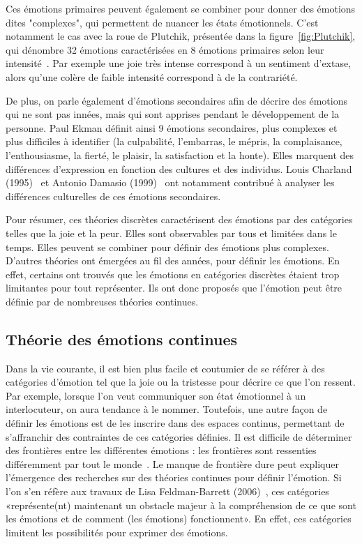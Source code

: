 

Ces émotions primaires peuvent également se combiner pour donner des émotions dites "complexes", qui permettent de nuancer les états émotionnels. C'est notamment le cas avec la roue de Plutchik, présentée dans la figure~\ref{fig:Plutchik}, qui dénombre 32 émotions caractérisées en 8 émotions primaires selon leur intensité~\cite{Plutchik1980}. Par exemple une joie très intense correspond à un sentiment d'extase, alors qu'une colère de faible intensité correspond à de la contrariété.

De plus, on parle également d'émotions secondaires afin de décrire des émotions qui ne sont pas innées, mais qui sont apprises pendant le développement de la personne. Paul Ekman définit ainsi 9 émotions secondaires, plus complexes et plus difficiles à identifier (la culpabilité, l'embarras, le mépris, la complaisance, l'enthousiasme, la fierté, le plaisir, la satisfaction et la honte). Elles marquent des différences d'expression en fonction des cultures et des individus. Louis Charland (1995)~\cite{Charland1995} et Antonio Damasio (1999)~\cite{Damasio1999} ont notamment contribué à analyser les différences culturelles de ces émotions secondaires.

Pour résumer, ces théories discrètes caractérisent des émotions par des catégories telles que la joie et la peur. Elles sont observables par tous et limitées dans le temps. Elles peuvent se combiner pour définir des émotions plus complexes.
D'autres théories ont émergées au fil des années, pour définir les émotions. En effet, certains ont trouvés que les émotions en catégories discrètes étaient trop limitantes pour tout représenter. Ils ont donc proposés que l'émotion peut être définie par de nombreuses théories continues.


\subsection{Théorie des émotions continues}
Dans la vie courante, il est bien plus facile et coutumier de se référer à des catégories d'émotion tel que la joie ou la tristesse pour décrire ce que l'on ressent. Par exemple, lorsque l'on veut communiquer son état émotionnel à un interlocuteur, on aura tendance à le nommer. Toutefois, une autre façon de définir les émotions est de les inscrire dans des espaces continus, permettant de s'affranchir des contraintes de ces catégories définies. Il est difficile de déterminer des frontières entre les différentes émotions : les frontières sont ressenties différemment par tout le monde~\cite{Busso2012}. Le manque de frontière dure peut expliquer l'émergence des recherches sur des théories continues pour définir l'émotion. Si l'on s'en réfère aux travaux de Lisa Feldman-Barrett (2006)~\cite{Feldman2006}, ces catégories «représente(nt) maintenant un obstacle majeur à la compréhension de ce que sont les émotions et de comment (les émotions) fonctionnent». En effet, ces catégories limitent les possibilités pour exprimer des émotions.

